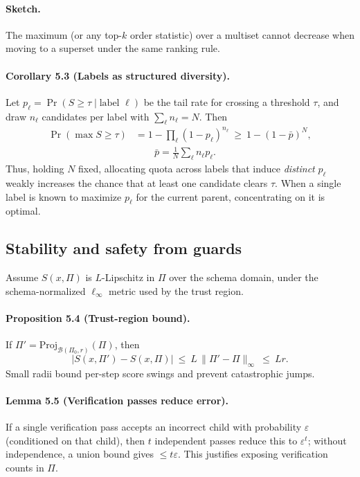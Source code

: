 \documentclass{article}
\theoremstyle{plain}
\theoremstyle{definition}
\theoremstyle{remark}
\begin{document}
\paragraph{Sketch.}
The maximum (or any top-$k$ order statistic) over a multiset cannot decrease when moving to a superset under the same ranking rule.

\paragraph{Corollary 5.3 (Labels as structured diversity).}
Let $p_\ell=\Pr(S\ge\tau\mid \text{label } \ell)$ be the tail rate for crossing a threshold $\tau$, and draw $n_\ell$ candidates per label with $\sum_\ell n_\ell=N$. Then
\begin{align*}
  \Pr(\max S\ge\tau)&=1-\prod_\ell (1-p_\ell)^{n_\ell}\ \ge\ 1-(1-\bar p)^N,\\
  &\qquad \bar p=\tfrac{1}{N}\sum_\ell n_\ell p_\ell.
\end{align*}
Thus, holding $N$ fixed, allocating quota across labels that induce \emph{distinct} $p_\ell$ weakly increases the chance that at least one candidate clears $\tau$. 
When a single label is known to maximize $p_\ell$ for the current parent, concentrating on it is optimal.

\subsection{Stability and safety from guards}

Assume $S(x,\Pi)$ is $L$-Lipschitz in $\Pi$ over the schema domain, under the schema-normalized $\ell_\infty$ metric used by the trust region.

\paragraph{Proposition 5.4 (Trust-region bound).}
If $\Pi'=\mathrm{Proj}_{\mathcal{B}(\Pi_0,r)}(\Pi)$, then
\[
\big|S(x,\Pi')-S(x,\Pi)\big|\ \le\ L\,\|\Pi'-\Pi\|_\infty\ \le\ Lr.
\]
Small radii bound per-step score swings and prevent catastrophic jumps.

\paragraph{Lemma 5.5 (Verification passes reduce error).}
If a single verification pass accepts an incorrect child with probability $\varepsilon$ (conditioned on that child), then $t$ independent passes reduce this to $\varepsilon^t$; without independence, a union bound gives $\le t\varepsilon$. 
This justifies exposing verification counts in $\Pi$.
\end{document}
